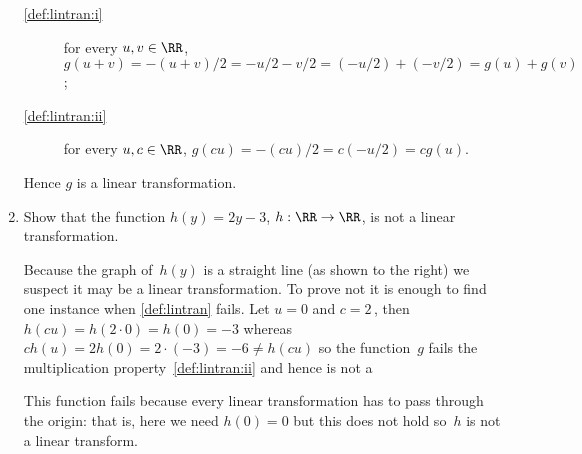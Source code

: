\begin{example}[1D cases]
\begin{enumerate}
\begin{solution}
\begin{figbox}{}
\end{figbox}
\begin{description}
\item[\cref{def:lintran:i}] for every \(u,v\in\RR\), \(g(u+v)=-(u+v)/2=-u/2-v/2=(-u/2)+(-v/2)=g(u)+g(v)\);
\item[\cref{def:lintran:ii}] for every \(u,c\in\RR\), \(g(cu)=-(cu)/2=c(-u/2)=cg(u)\).
\end{description}
Hence \(g\) is a linear transformation.
\end{solution}



\item 
\begin{figbox}{}
Show that the function \(h(y)=2y-3\), \(h:\RR\to\RR\), is not a linear transformation.

\begin{solution} 
Because the graph of~\(h(y)\) is a straight line (as shown to the right) we suspect it may be a linear transformation.
To prove not it is enough to find one instance when \cref{def:lintran} fails. 
Let \(u=0\) and \(c=2\)\,, then \(h(cu)=h(2\cdot0)=h(0)=-3\) whereas \(ch(u)=2h(0)=2\cdot(-3)=-6\neq h(cu)\) so the function~\(g\) fails the multiplication property~\ref{def:lintran:ii} and hence is not a 

This function fails because every linear transformation has to pass through the origin: that is, here we need \(h(0)=0\) but this does not hold so~\(h\) is not a linear transform.
\end{solution}
\end{figbox}

\end{enumerate}
\end{example}

